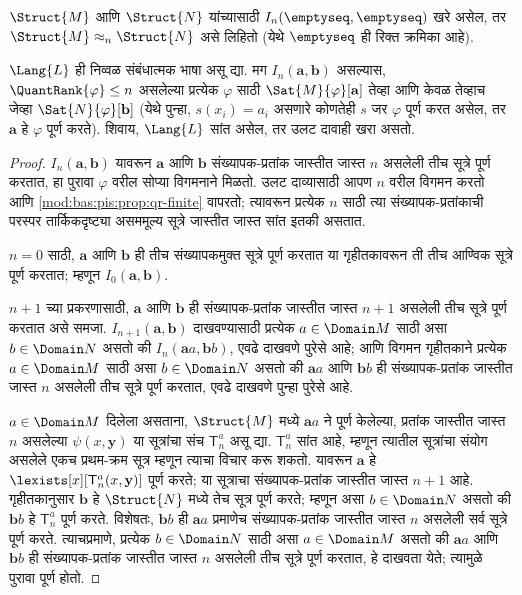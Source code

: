 \begin{defn}
  $\Struct{M}$ आणि $\Struct{N}$ यांच्यासाठी
  $I_n(\emptyseq,\emptyseq)$ खरे असेल, तर $\Struct{M} \approx_n
  \Struct{N}$ असे लिहितो (येथे $\emptyseq$ ही रिक्त क्रमिका आहे).
\end{defn}

\begin{thm}\label{mod:bas:pis:thm:b-n-f}
  $\Lang{L}$ ही निव्वळ संबंधात्मक भाषा असू द्या. मग
  $I_n (\mathbf{a},\mathbf{b})$ असल्यास, $\QuantRank{\varphi} \le n$ असलेल्या
  प्रत्येक $\varphi$ साठी $\Sat{M}{\varphi}[\mathbf{a}]$ तेव्हा आणि केवळ तेव्हाच
  जेव्हा $\Sat{N}{\varphi}[\mathbf{b}]$ (येथे पुन्हा, $s(x_i) = a_i$ असणारे
  कोणतेही $s$ जर $\varphi$ पूर्ण करत असेल, तर $\mathbf{a}$ हे $\varphi$ पूर्ण
  करते). शिवाय, $\Lang{L}$ सांत असेल, तर उलट दावाही खरा असतो.
\end{thm}

\begin{proof}
  $I_n(\mathbf{a},\mathbf{b})$ यावरून $\mathbf{a}$ आणि $\mathbf{b}$
  संख्यापक-प्रतांक जास्तीत जास्त $n$ असलेली तीच सूत्रे पूर्ण करतात,
  हा पुरावा $\varphi$ वरील सोप्या विगमनाने मिळतो. उलट दाव्यासाठी आपण $n$
  वरील विगमन करतो आणि \ref{mod:bas:pis:prop:qr-finite} वापरतो; त्यावरून प्रत्येक
  $n$ साठी त्या संख्यापक-प्रतांकाची परस्पर तार्किकदृष्ट्या असममूल्य
  सूत्रे जास्तीत जास्त सांत इतकी असतात.

  $n=0$ साठी, $\mathbf{a}$ आणि $\mathbf{b}$ ही तीच संख्यापकमुक्त
  सूत्रे पूर्ण करतात या गृहीतकावरून ती तीच आण्विक सूत्रे पूर्ण करतात;
  म्हणून $I_0(\mathbf{a},\mathbf{b})$.

  $n+1$ च्या प्रकरणासाठी, $\mathbf{a}$ आणि $\mathbf{b}$ ही
  संख्यापक-प्रतांक जास्तीत जास्त $n+1$ असलेली तीच सूत्रे पूर्ण
  करतात असे समजा. $I_{n+1}(\mathbf{a},\mathbf{b})$ दाखवण्यासाठी प्रत्येक
  $a \in \Domain M$ साठी असा $b \in \Domain N$ असतो की
  $I_n(\mathbf{a}a,\mathbf{b}b)$, एवढे दाखवणे पुरेसे आहे; आणि विगमन
  गृहीतकाने प्रत्येक $a \in \Domain M$ साठी असा $b \in \Domain N$ असतो
  की $\mathbf{a}a$ आणि $\mathbf{b}b$ ही संख्यापक-प्रतांक जास्तीत जास्त
  $n$ असलेली तीच सूत्रे पूर्ण करतात, एवढे दाखवणे पुन्हा पुरेसे आहे.

  $a \in \Domain M$ दिलेला असताना, $\Struct{M}$ मध्ये $\mathbf{a}a$ ने
  पूर्ण केलेल्या, प्रतांक जास्तीत जास्त $n$ असलेल्या
  $\psi(x,\mathbf{y})$ या सूत्रांचा संच $\mathsf{T}^a_n$ असू द्या.
  $\mathsf{T}^a_n$ सांत आहे, म्हणून त्यातील सूत्रांचा संयोग असलेले एकच प्रथम-क्रम
  सूत्र म्हणून त्याचा विचार करू शकतो. यावरून $\mathbf{a}$ हे
  $\lexists[x][\mathsf{T}^a_n(x,\mathbf{y})]$ पूर्ण करते; या सूत्राचा
  संख्यापक-प्रतांक जास्तीत जास्त $n+1$ आहे. गृहीतकानुसार $\mathbf{b}$ हे
  $\Struct{N}$ मध्ये तेच सूत्र पूर्ण करते; म्हणून असा $b \in
  \Domain N$ असतो की $\mathbf{b}b$ हे $\mathsf{T}^a_n$ पूर्ण करते. विशेषतः,
  $\mathbf{b}b$ ही $\mathbf{a}a$ प्रमाणेच संख्यापक-प्रतांक जास्तीत जास्त
  $n$ असलेली सर्व सूत्रे पूर्ण करते. त्याचप्रमाणे, प्रत्येक $b \in
  \Domain N$ साठी असा $a\in \Domain M$ असतो की $\mathbf{a}a$ आणि
  $\mathbf{b}b$ ही संख्यापक-प्रतांक जास्तीत जास्त $n$ असलेली तीच
  सूत्रे पूर्ण करतात, हे दाखवता येते; त्यामुळे पुरावा पूर्ण होतो.
\end{proof}

